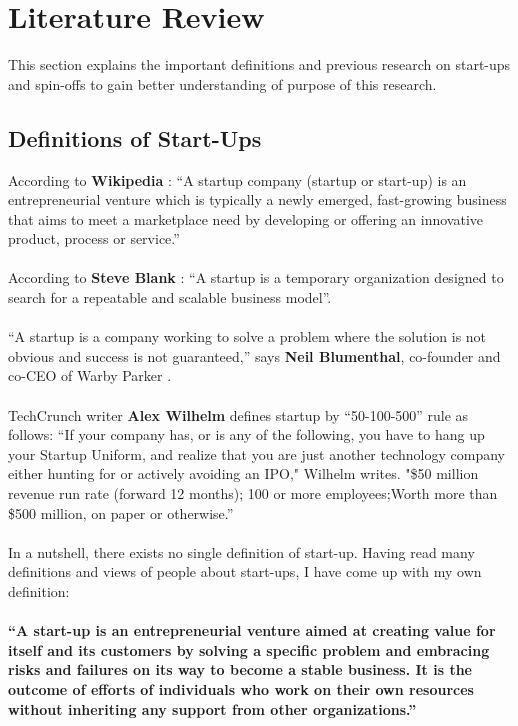 \chapter{Literature Review\label{cha:chapter2}}

This section explains the important definitions and previous research on start-ups and spin-offs to
gain better understanding of purpose of this research.

\section{Definitions of Start-Ups \label{sec:defs}}
According to \textbf{Wikipedia} \cite{6}:
``A startup company (startup or start-up) is an entrepreneurial venture which is typically a newly
emerged, fast-growing business that aims to meet a marketplace need by developing or offering an
innovative product, process or service.''
\\
\\
According to \textbf{Steve Blank} \cite{8}:
``A startup is a temporary organization designed to search for a repeatable and scalable business
model''.
\\
\\
``A startup is a company working to solve a problem where the solution is not obvious and success
is not guaranteed,'' says \textbf{Neil Blumenthal}, co-founder and co-CEO of Warby Parker \cite{9}.
\\
\\
TechCrunch writer \textbf{Alex Wilhelm} defines startup by ``50-100-500'' rule as follows:
``If your company has, or is any of the following, you have to hang up your Startup Uniform, and
realize that you are just another technology company either hunting for or actively avoiding an
IPO," Wilhelm writes. "\$50 million revenue run rate (forward 12 months); 100 or more
employees;Worth more than \$500 million, on paper or otherwise.'' \cite{10}
\\
\\
In a nutshell, there exists no single definition of start-up. Having read many definitions and views of
people about start-ups, I have come up with my own definition:
\\
\\
\textbf{``A start-up is an entrepreneurial venture aimed at creating value for itself and its customers by
solving a specific problem and embracing risks and failures on its way to become a stable business.
It is the outcome of efforts of individuals who work on their own resources without inheriting any
support from other organizations.''}
\\
\\

